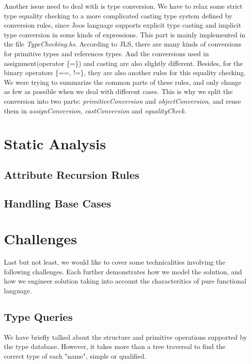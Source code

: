 \documentclass[12pt,letterpaper]{article}
\begin{document}
Another issue need to deal with is type conversion.
We have to relax some strict type equality checking to a more complicated casting type system defined by conversion rules, since Joos language supports explicit type casting and implicit type conversion in some kinds of expressions.
This part is mainly implemented in the file \emph{TypeChecking.hs}.
According to JLS, there are many kinds of conversions for primitive types and references types.
And the conversions used in assignment(operator \{=\}) and casting are also slightly different.
Besides, for the binary operators \{==, !=\}, they are also another rules for this equality checking.
We were trying to summarize the common parts of these rules, and only change as few as possible when we deal with different cases.
This is why we split the conversion into two parts: \emph{primitiveConversion} and \emph{objectConversion}, and reuse them in \emph{assignConversion}, \emph{castConversion} and \emph{equalityCheck}.


\section{Static Analysis}

\subsection{Attribute Recursion Rules}
\subsection{Handling Base Cases}


\section{Challenges}
Last but not least, we would like to cover some technicalities involving the following challenges. Each further demonstrates how we model the solution, and how we engineer solution taking into account the characteritics of pure functional language.

\subsection{Type  Queries}
We have briefly talked about the structure and primitive operations supported by the type database. However, it takes more than a tree traversal to find the correct type of each "name", simple or qualified.
\end{document}
